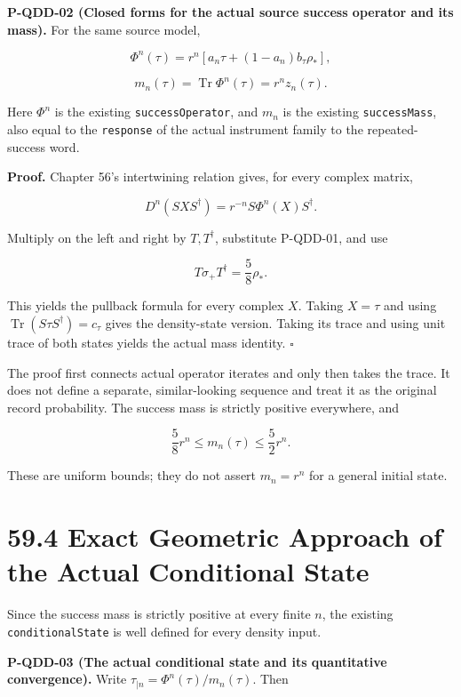 \documentclass[
  11pt,
  oneside]{book}
\begin{document}
\label{p-qdd-02}{}

\textbf{P-QDD-02 (Closed forms for the actual source success operator
and its mass).} For the same source model,

\[
\Phi^n(\tau)
=r^n\left[a_n\tau+(1-a_n)b_\tau\rho_*\right],
\]

\[
m_n(\tau)=\operatorname{Tr}\Phi^n(\tau)
=r^nz_n(\tau).
\]

Here \(\Phi^n\) is the existing \texttt{success\allowbreak Operator}, and \(m_n\) is
the existing \texttt{success\allowbreak Mass}, also equal to the \texttt{response}
of the actual instrument family to the repeated-success word.

\textbf{Proof.} Chapter 56's intertwining relation gives, for every
complex matrix,

\[
D^n(SXS^\dagger)=r^{-n}S\Phi^n(X)S^\dagger.
\]

Multiply on the left and right by \(T,T^\dagger\), substitute P-QDD-01,
and use

\[
T\sigma_+T^\dagger=\frac58\rho_*.
\]

This yields the pullback formula for every complex \(X\). Taking
\(X=\tau\) and using \(\operatorname{Tr}(S\tau S^\dagger)=c_\tau\) gives
the density-state version. Taking its trace and using unit trace of both
states yields the actual mass identity. \(\square\)

The proof first connects actual operator iterates and only then takes
the trace. It does not define a separate, similar-looking sequence and
treat it as the original record probability. The success mass is
strictly positive everywhere, and

\[
\frac58r^n\le m_n(\tau)\le\frac52r^n.
\]

These are uniform bounds; they do not assert \(m_n=r^n\) for a general
initial state.

\section{59.4 Exact Geometric Approach of the Actual Conditional State}

Since the success mass is strictly positive at every finite \(n\), the
existing \texttt{conditional\allowbreak State} is well defined for every density
input.

\label{p-qdd-03}{}

\textbf{P-QDD-03 (The actual conditional state and its quantitative
convergence).} Write \(\tau_{\mid n}=\Phi^n(\tau)/m_n(\tau)\). Then
\end{document}
